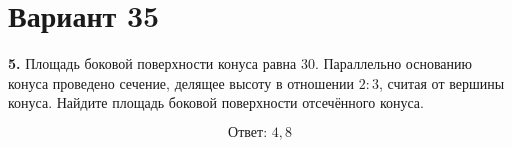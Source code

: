 \documentclass[12pt,a4paper]{article}
\begin{document}
\section*{Вариант 35}

\textbf{5.} Площадь боковой поверхности конуса равна \(30\).
Параллельно основанию конуса проведено сечение,
делящее высоту в отношении \(2:3\), считая от вершины конуса.
Найдите площадь боковой поверхности отсечённого конуса.

\begin{center}
\end{center}

\[
\boxed{\text{Ответ: }4{,}8}
\]
\end{document}
